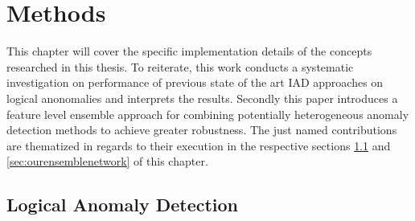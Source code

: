 \chapter{Methods}
\label{chap:method}

This chapter will cover the specific implementation details of the concepts researched in this thesis. To reiterate, this work conducts a systematic investigation on performance of previous state 
of the art IAD approaches on logical anonomalies and interprets the results. Secondly this paper introduces a feature level ensemble approach for combining potentially heterogeneous anomaly detection methods to achieve greater robustness. 
The just named contributions 
are thematized in regards to their execution in the respective sections \ref{sec:lcocsurveymethods} and \ref{sec:ourensemblenetwork} of this chapter.


\section{Logical Anomaly Detection}
\label{sec:lcocsurveymethods}

